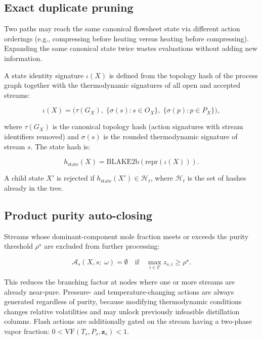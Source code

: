 \documentclass[11pt,a4paper]{article}
\theoremstyle{definition}
\theoremstyle{plain}
\newcommand{\calC}{\mathcal{C}}
\newcommand{\calA}{\mathcal{A}}
\begin{document}
\subsection{Exact duplicate pruning}
\label{sec:dup_pruning}

Two paths may reach the same canonical flowsheet state via different action orderings (e.g., compressing before heating versus heating before compressing). Expanding the same canonical state twice wastes evaluations without adding new information.

A state identity signature $\iota(X)$ is defined from the topology hash of the process graph together with the thermodynamic signatures of all open and accepted streams:

\begin{equation}
 \iota(X) = \bigl(
  \tau(G_X),\;
  \{\sigma(s) : s \in O_X\},\;
  \{\sigma(p) : p \in P_X\}
 \bigr),
\end{equation}

where $\tau(G_X)$ is the canonical topology hash (action signatures with stream identifiers removed) and $\sigma(s)$ is the rounded thermodynamic signature of stream $s$. The state hash is:

\begin{equation}
 h_{\mathrm{state}}(X) = \mathrm{BLAKE2b}(\mathrm{repr}(\iota(X))).
\end{equation}

A child state $X'$ is rejected if $h_{\mathrm{state}}(X') \in \mathcal{H}_t$, where $\mathcal{H}_t$ is the set of hashes already in the tree.

\subsection{Product purity auto-closing}
\label{sec:auto_close}

Streams whose dominant-component mole fraction meets or exceeds the purity threshold $\rho^\star$ are excluded from further processing:

\begin{equation}
 \calA_s(X, s;\; \omega) = \emptyset
 \quad\text{if}\quad
 \max_{i \in \calC} z_{s,i} \geq \rho^\star.
\end{equation}

This reduces the branching factor at nodes where one or more streams are already near-pure. Pressure- and temperature-changing actions are always generated regardless of purity, because modifying thermodynamic conditions changes relative volatilities and may unlock previously infeasible distillation columns. Flash actions are additionally gated on the stream having a two-phase vapor fraction: $0 < \mathrm{VF}(T_s, P_s, \bm{z}_s) < 1$.
\end{document}
